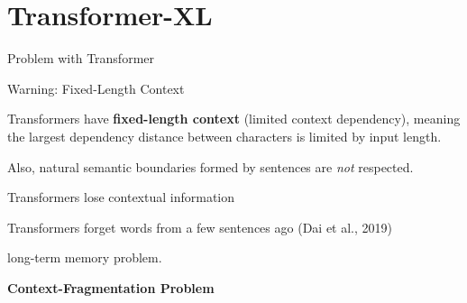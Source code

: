 

\section{Transformer-XL }


\begin{frame}{Problem with Transformer}
    
    \begin{alertBlock}{Warning: Fixed-Length Context}
        \large 
        
        Transformers have \textbf{\alert{fixed-length context}} (limited context dependency), meaning the largest dependency distance between characters is limited by input length. 
        
        Also, natural semantic boundaries formed by sentences are \textit{not} respected. 
        
        \begin{addmargin}{3em}{}
        \begin{itemizeSpaced}{2pt}
            \arrowitem Transformers lose contextual information 
            
            \arrowitem Transformers forget words from a few sentences ago (Dai et al., 2019) 
            
            \arrowitem long-term memory problem.
            
            \arrowitem \textbf{Context-Fragmentation Problem}
        \end{itemizeSpaced}
        \end{addmargin} 
        
    \end{alertBlock}
    

\end{frame}
    
